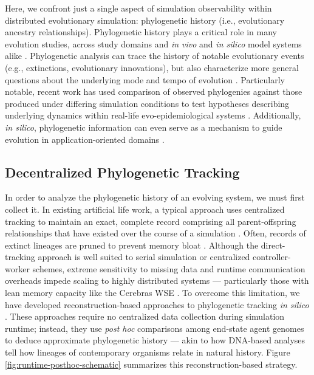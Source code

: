 Here, we confront just a single aspect of simulation observability within distributed evolutionary simulation: phylogenetic history (i.e., evolutionary ancestry relationships).
Phylogenetic history plays a critical role in many evolution studies, across study domains and \textit{in vivo} and \textit{in silico} model systems alike \citep{faithConservationEvaluationPhylogenetic1992, STAMATAKIS2005phylogenetics,frenchHostPhylogenyShapes2023,kim2006discovery,lewinsohnStatedependentEvolutionaryModels2023a,lenski2003evolutionary}.
Phylogenetic analysis can trace the history of notable evolutionary events (e.g., extinctions, evolutionary innovations), but also characterize more general questions about the underlying mode and tempo of evolution \citep{moreno2023toward,hernandez2022can,shahbandegan2022untangling,lewinsohnStatedependentEvolutionaryModels2023a}.
Particularly notable, recent work has used comparison of observed phylogenies against those produced under differing simulation conditions to test hypotheses describing underlying dynamics within real-life evo-epidemiological systems \citep{giardina2017inference,voznica2022deep}.
Additionally, \textit{in silico}, phylogenetic information can even serve as a mechanism to guide evolution in application-oriented domains \citep{lalejini2024phylogeny,lalejini2024runtime,murphy2008simple,burke2003increased}.

\subsection{Decentralized Phylogenetic Tracking}

In order to analyze the phylogenetic history of an evolving system, we must first collect it.
In existing artificial life work, a typical approach uses centralized tracking to maintain an exact, complete record comprising all parent-offspring relationships that have existed over the course of a simulation \citep{ray1992evolution,bohm2017mabe,de2012deap,garwood2019revosim,godin2019apoget,dolson2024phylotrackpy}.
Often, records of extinct lineages are pruned to prevent memory bloat \citep{moreno2024analysis}.
Although the direct-tracking approach is well suited to serial simulation or centralized controller-worker schemes, extreme sensitivity to missing data and runtime communication overheads impede scaling to highly distributed systems --- particularly those with lean memory capacity like the Cerebras WSE \citep{moreno2024analysis}.
To overcome this limitation, we have developed reconstruction-based approaches to phylogenetic tracking \textit{in silico} \citep{moreno2022hereditary}.
These approaches require no centralized data collection during simulation runtime; instead, they use \textit{post hoc} comparisons among end-state agent genomes to deduce approximate phylogenetic history --- akin to how DNA-based analyses tell how lineages of contemporary organisms relate in natural history.
Figure \ref{fig:runtime-posthoc-schematic} summarizes this reconstruction-based strategy.

